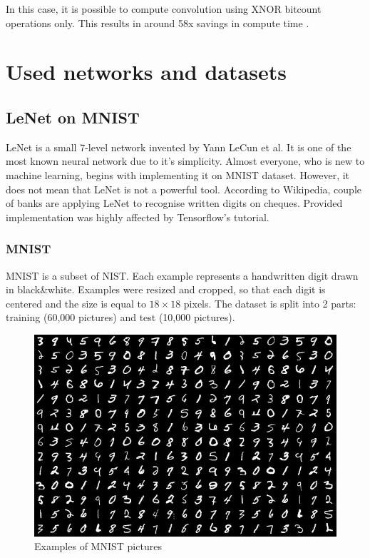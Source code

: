 \documentclass[licencjacka]{pracamgr}
\begin{document}
	    In this case, it is possible to compute convolution using XNOR bitcount operations only. This results in around 58x savings in compute time \cite{xornet}.

\chapter{Used networks and datasets}
		\section{LeNet on MNIST}
 		LeNet is a small 7-level network invented by Yann LeCun et al. It is one of the most known neural network due to it’s simplicity. Almost everyone, who is new to machine learning, begins with implementing it on MNIST dataset. However, it does not mean that LeNet is not a powerful tool. According to Wikipedia, couple of banks are applying LeNet to recognise written digits on cheques. Provided implementation was highly affected by Tensorflow's tutorial. \\
 		\subsection{MNIST}
 			MNIST is a subset of NIST. Each example represents a handwritten digit drawn in black\&white. Examples were resized and cropped, so that each digit is centered and the size is equal to $18\times18$ pixels. The dataset is split into 2 parts: training (60,000 pictures) and test (10,000 pictures).
 			\begin{figure}[h]
				\caption{Examples of MNIST pictures}
				\centering
				\includegraphics[width=\textwidth]{images/mnist}
			\end{figure}
\end{document}
